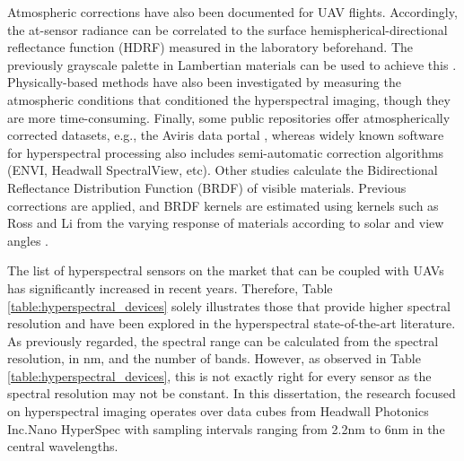 Atmospheric corrections have also been documented for UAV flights. Accordingly, the at-sensor radiance can be correlated to the surface hemispherical-directional reflectance function (HDRF) measured in the laboratory beforehand. The previously grayscale palette in Lambertian materials can be used to achieve this \cite{lucieer_hyperuasimaging_2014}. Physically-based methods have also been investigated by measuring the atmospheric conditions that conditioned the hyperspectral imaging, though they are more time-consuming. Finally, some public repositories offer atmospherically corrected datasets, e.g., the Aviris data portal \cite{california_institute_of_technology_aviris_nodate}, whereas widely known software for hyperspectral processing also includes semi-automatic correction algorithms (ENVI, Headwall SpectralView, etc). Other studies calculate the Bidirectional Reflectance Distribution Function (BRDF) of visible materials. Previous corrections are applied, and BRDF kernels are estimated using kernels such as Ross and Li from the varying response of materials according to solar and view angles \cite{queally_flexbrdf_2022, jia_kernel-driven_2020, sagan_data-driven_2022}.

The list of hyperspectral sensors on the market that can be coupled with UAVs has significantly increased in recent years. Therefore, Table \ref{table:hyperspectral_devices} solely illustrates those that provide higher spectral resolution and have been explored in the hyperspectral state-of-the-art literature. As previously regarded, the spectral range can be calculated from the spectral resolution, in \si{\nano\meter}, and the number of bands. However, as observed in Table \ref{table:hyperspectral_devices}, this is not exactly right for every sensor as the spectral resolution may not be constant. In this dissertation, the research focused on hyperspectral imaging operates over data cubes from Headwall Photonics Inc.\textregistered Nano HyperSpec with  sampling intervals ranging from 2.2\si{\nano\meter} to 6\si{\nano\meter} in the central wavelengths.

